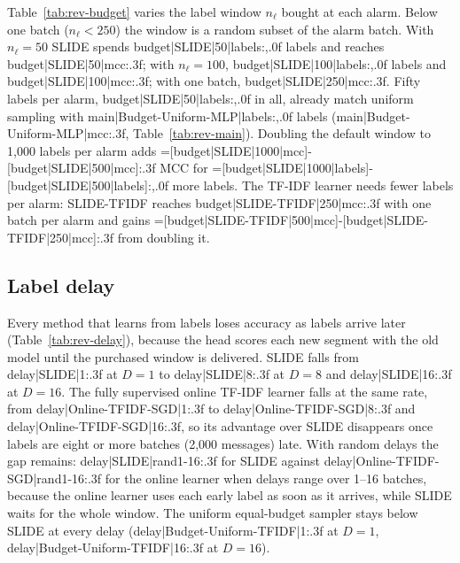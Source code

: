 {{{{

Table~\ref{tab:rev-budget} varies the label window $n_\ell$ bought at each alarm. Below one batch ($n_\ell<250$) the window is a random subset of the alarm batch. With $n_\ell=50$ SLIDE spends {{budget|SLIDE|50|labels:,.0f}} labels and reaches {{budget|SLIDE|50|mcc:.3f}}; with $n_\ell=100$, {{budget|SLIDE|100|labels:,.0f}} labels and {{budget|SLIDE|100|mcc:.3f}}; with one batch, {{budget|SLIDE|250|mcc:.3f}}. Fifty labels per alarm, {{budget|SLIDE|50|labels:,.0f}} in all, already match uniform sampling with {{main|Budget-Uniform-MLP|labels:,.0f}} labels ({{main|Budget-Uniform-MLP|mcc:.3f}}, Table~\ref{tab:rev-main}). Doubling the default window to 1{,}000 labels per alarm adds {{=[budget|SLIDE|1000|mcc]-[budget|SLIDE|500|mcc]:.3f}} MCC for {{=[budget|SLIDE|1000|labels]-[budget|SLIDE|500|labels]:,.0f}} more labels. The TF-IDF learner needs fewer labels per alarm: SLIDE-TFIDF reaches {{budget|SLIDE-TFIDF|250|mcc:.3f}} with one batch per alarm and gains {{=[budget|SLIDE-TFIDF|500|mcc]-[budget|SLIDE-TFIDF|250|mcc]:.3f}} from doubling it.



\subsection{Label delay}\label{sec:delay}
Every method that learns from labels loses accuracy as labels arrive later (Table~\ref{tab:rev-delay}), because the head scores each new segment with the old model until the purchased window is delivered. SLIDE falls from {{delay|SLIDE|1:.3f}} at $D=1$ to {{delay|SLIDE|8:.3f}} at $D=8$ and {{delay|SLIDE|16:.3f}} at $D=16$. The fully supervised online TF-IDF learner falls at the same rate, from {{delay|Online-TFIDF-SGD|1:.3f}} to {{delay|Online-TFIDF-SGD|8:.3f}} and {{delay|Online-TFIDF-SGD|16:.3f}}, so its advantage over SLIDE disappears once labels are eight or more batches (2{,}000 messages) late. With random delays the gap remains: {{delay|SLIDE|rand1-16:.3f}} for SLIDE against {{delay|Online-TFIDF-SGD|rand1-16:.3f}} for the online learner when delays range over 1--16 batches, because the online learner uses each early label as soon as it arrives, while SLIDE waits for the whole window. The uniform equal-budget sampler stays below SLIDE at every delay ({{delay|Budget-Uniform-TFIDF|1:.3f}} at $D=1$, {{delay|Budget-Uniform-TFIDF|16:.3f}} at $D=16$).



}}}}
